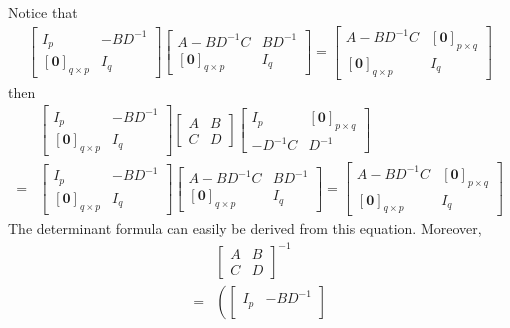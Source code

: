\begin{Answer}
Notice that
\begin{align*}
\begin{bmatrix}
I_p & -BD^{-1} \\
[\textbf{0}]_{q \times p} & I_q
\end{bmatrix}
\begin{bmatrix}
A - BD^{-1}C & BD^{-1} \\
[\textbf{0}]_{q \times p} & I_q
\end{bmatrix}
=
\begin{bmatrix}
A - BD^{-1}C & [\textbf{0}]_{p \times q} \\
[\textbf{0}]_{q \times p} & I_q
\end{bmatrix}
\end{align*}
then
\begin{align*}
&\begin{bmatrix}
I_p & -BD^{-1} \\
[\textbf{0}]_{q \times p} & I_q
\end{bmatrix}
\begin{bmatrix}
A & B \\
C & D
\end{bmatrix}
\begin{bmatrix}
I_p & [\textbf{0}]_{p \times q} \\
-D^{-1}C & D^{-1}
\end{bmatrix} \\
=&
\begin{bmatrix}
I_p & -BD^{-1} \\
[\textbf{0}]_{q \times p} & I_q
\end{bmatrix}
\begin{bmatrix}
A - BD^{-1}C & BD^{-1} \\
[\textbf{0}]_{q \times p} & I_q
\end{bmatrix} =
\begin{bmatrix}
A - BD^{-1}C & [\textbf{0}]_{p \times q} \\
[\textbf{0}]_{q \times p} & I_q
\end{bmatrix}
\end{align*}
The determinant formula can easily be derived from this equation. Moreover,
\begin{align*}
& \begin{bmatrix}
A & B \\
C & D
\end{bmatrix}^{-1} \\
=& 
\left(
\begin{bmatrix}
I_p & -BD^{-1} \\

\end{bmatrix}
\end{align*}
\end{Answer}
